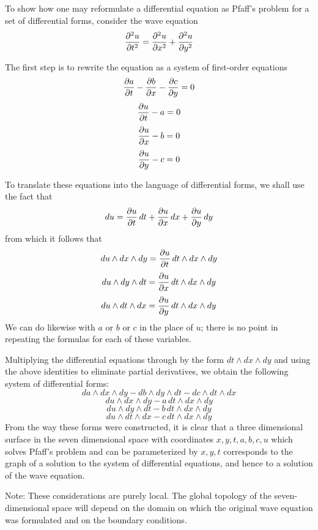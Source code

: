 \documentclass[12pt]{article}
\begin{document}
To show how one may reformulate a differential equation as Pfaff's problem for a set of differential forms, consider the wave equation
 $${\partial^2 u \over \partial t^2} = {\partial^2 u \over \partial x^2} + {\partial^2 u \over \partial y^2}$$

The first step is to rewrite the equation as a system of first-order equations
 $${\partial a \over \partial t} - {\partial b \over \partial x} - {\partial c \over \partial y} = 0$$
 $${\partial u \over \partial t} - a = 0$$
 $${\partial u \over \partial x} - b = 0$$
 $${\partial u \over \partial y} - c = 0$$

To translate these equations into the language of differential forms, we shall use the fact that
 $$du = {\partial u \over \partial t} \, dt + {\partial u \over \partial x} \, dx + {\partial u \over \partial y} \, dy$$
from which it follows that
 $$du \wedge dx \wedge dy = {\partial u \over \partial t} \, dt \wedge dx \wedge dy$$
 $$du \wedge dy \wedge dt = {\partial u \over \partial x} \, dt \wedge dx \wedge dy$$
 $$du \wedge dt \wedge dx = {\partial u \over \partial y} \, dt \wedge dx \wedge dy$$
We can do likewise with $a$ or $b$ or $c$ in the place of $u$; there is no point in repeating the formulas for each of these variables.

Multiplying the differential equations through by the form $dt \wedge dx \wedge dy$ and using the above identities to eliminate partial derivatives, we obtain the following system of differential forms:
 $$da \wedge dx \wedge dy - db \wedge dy \wedge dt - dc \wedge dt \wedge dx$$
 $$du \wedge dx \wedge dy - a \, dt \wedge dx \wedge dy$$
 $$du \wedge dy \wedge dt - b \, dt \wedge dx \wedge dy$$
 $$du \wedge dt \wedge dx - c \, dt \wedge dx \wedge dy$$
From the way these forms were constructed, it is clear that a three dimensional surface in the seven dimensional space with coordinates $x,y,t,a,b,c,u$ which solves Pfaff's problem and can be parameterized by $x,y,t$ corresponds to the graph of a solution to the system of differential equations, and hence to a solution of the wave equation.

Note: These considerations are purely local.  The global topology of the seven-dimensional space will depend on the domain on which the original wave equation was formulated and on the boundary conditions.
\end{document}

